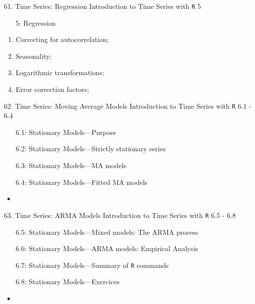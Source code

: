 \begin{CHPT_SUMM_AUTO}[label = {L.-61}]{61. Time Series: Regression}
Introduction to Time Series with \texttt{R} 5
\begin{itemize}
	\item[5:]	Regression
\end{itemize}
\tcbline
	\begin{enumerate}
		\item	Correcting for autocorrelation;
		\item	Seasonality;
		\item	Logarithmic transformations;
		\item	Error correction factors;
	\end{enumerate}
\end{CHPT_SUMM_AUTO}

\begin{CHPT_SUMM_AUTO}[label = {L.-62}]{62. Time Series: Moving Average Models}
Introduction to Time Series with \texttt{R} 6.1 - 6.4
\begin{itemize}
	\item[6.1:]	Stationary Models---Purpose
	\item[6.2:]	Stationary Models---Strictly stationary series
	\item[6.3:]	Stationary Models---MA models
	\item[6.4:]	Stationary Models---Fitted MA models
\end{itemize}
\tcbline
	\begin{itemize}
		\item	
	\end{itemize}
\end{CHPT_SUMM_AUTO}

\begin{CHPT_SUMM_AUTO}[label = {L.-63}]{63. Time Series: ARMA Models}
Introduction to Time Series with \texttt{R} 6.5 - 6.8
\begin{itemize}
	\item[6.5:]	Stationary Models---Mixed models: The ARMA process
	\item[6.6:]	Stationary Models---ARMA models: Empirical Analysis
	\item[6.7:]	Stationary Models---Summary of \texttt{R} commands
	\item[6.8:]	Stationary Models---Exercices
\end{itemize}
\tcbline
	\begin{itemize}
		\item	
	\end{itemize}
\end{CHPT_SUMM_AUTO}


